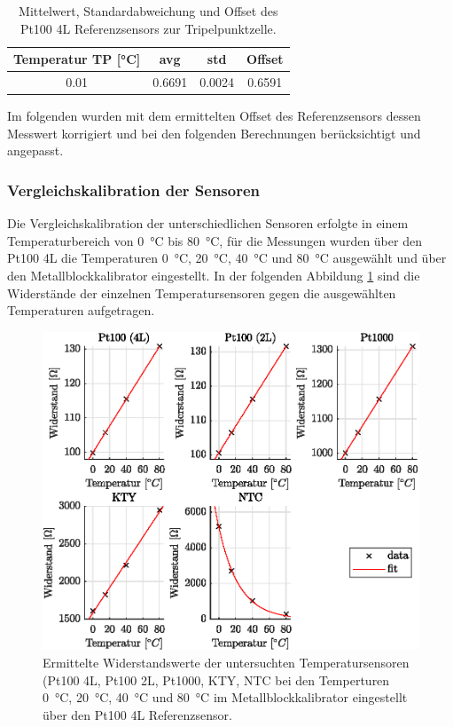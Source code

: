 \begin{table}[H]
	\centering
	\caption{Mittelwert, Standardabweichung und Offset des Pt100 4L Referenzsensors zur Tripelpunktzelle.}
	\label{tab:VergleichTPZ}
	\begin{tabular}{cccc}
		Temperatur TP [\si{\celsius}] & avg & std & Offset \\ 
		\hline 
		\num{0.01} & \num{0.6691} & \num{0.0024} &  \num{0.6591}\\ 
	\end{tabular} 
\end{table}


Im folgenden wurden mit dem ermittelten Offset des Referenzsensors dessen Messwert korrigiert und bei den folgenden Berechnungen berücksichtigt und angepasst. 

\subsubsection{Vergleichskalibration der Sensoren}

Die Vergleichskalibration der unterschiedlichen Sensoren erfolgte in einem Temperaturbereich von \SI{0}{\celsius} bis \SI{80}{\celsius}, für die Messungen wurden über den Pt100 4L die Temperaturen \SI{0}{\celsius}, \SI{20}{\celsius}, \SI{40}{\celsius} und \SI{80}{\celsius} ausgewählt und über den Metallblockkalibrator eingestellt. In der folgenden Abbildung \ref{fig:Widerstand} sind die Widerstände der einzelnen Temperatursensoren gegen die ausgewählten Temperaturen aufgetragen. 

\begin{figure}[H]
	\centering
	\includegraphics[height=0.5\textheight]{../MLAB/Widerstandsgeraden.eps}
	\caption[Ermittelte Widerstandswerte der untersuchten Temperatursensoren ]{Ermittelte Widerstandswerte der untersuchten Temperatursensoren (Pt100 4L, Pt100 2L, Pt1000, KTY, NTC bei den Temperturen \SI{0}{\celsius}, \SI{20}{\celsius}, \SI{40}{\celsius} und \SI{80}{\celsius} im Metallblockkalibrator eingestellt über den Pt100 4L Referenzsensor. }
	\label{fig:Widerstand}
\end{figure}

